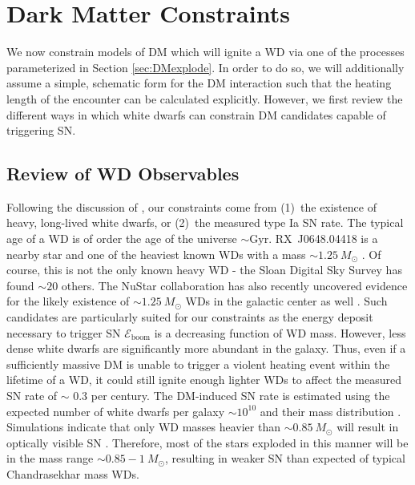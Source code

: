 \documentclass[twocolumn,preprintnumbers,amsmath,amssymb,prd, superscriptaddress]{revtex4} %
\newcommand{\Eboom}{\mathcal{E}_\text{boom}}
\begin{document}
\section{Dark Matter Constraints}
\label{sec:Constraints}

We now constrain models of DM which will ignite a WD via one of the processes parameterized in Section \ref{sec:DMexplode}.
In order to do so, we will additionally assume a simple, schematic form for the DM interaction such that the heating length of the encounter can be calculated explicitly.
However, we first review the different ways in which white dwarfs can constrain DM candidates capable of triggering SN.

\subsection{Review of WD Observables}
Following the discussion of \cite{Graham:2015apa}, our constraints come from (1)~the existence of heavy, long-lived white dwarfs, or (2)~the measured type Ia SN rate.
The typical age of a WD is of order the age of the universe $\sim \text{Gyr}$.
RX~J0648.04418 is a nearby star and one of the heaviest known WDs with a mass $\sim 1.25 ~M_{\odot}$ \cite{Mereghetti:2013nba}.
Of course, this is not the only known heavy WD - the Sloan Digital Sky Survey \cite{SDSS} has found $\sim 20$ others.
The NuStar collaboration has also recently uncovered evidence for the likely existence of $\sim 1.25 ~M_{\odot}$ WDs in the galactic center as well \cite{NuStar}.
Such candidates are particularly suited for our constraints as the energy deposit necessary to trigger SN $\Eboom$ is a decreasing function of WD mass.
However, less dense white dwarfs are significantly more abundant in the galaxy.
Thus, even if a sufficiently massive DM is unable to trigger a violent heating event within the lifetime of a WD, it could still ignite enough lighter WDs to affect the measured SN rate of $\sim $ 0.3 per century.
The DM-induced SN rate is estimated using the expected number of white dwarfs per galaxy $\sim 10^{10}$ and their mass distribution \cite{SDSS}.
Simulations indicate that only WD masses heavier than $\sim 0.85 ~M_{\odot}$ will result in optically visible SN \cite{Graham:2015apa}.
Therefore, most of the stars exploded in this manner will be in the mass range $\sim 0.85 - 1 ~M_{\odot}$, resulting in weaker SN than expected of typical Chandrasekhar mass WDs.
\end{document}
